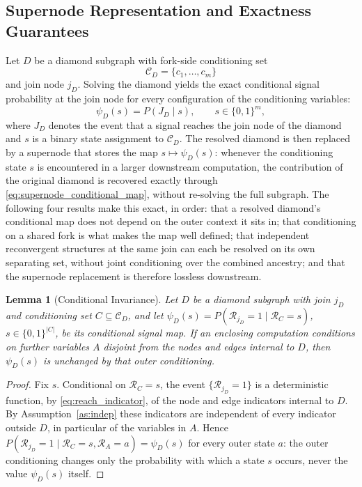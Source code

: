 \documentclass[preprint,12pt]{elsarticle}
\newtheorem{lemma}{Lemma}[section]
\begin{document}
\subsection{Supernode Representation and Exactness Guarantees}\label{sec:supernode}

Let $D$ be a diamond subgraph with fork-side conditioning set
\[
\mathcal{C}_D = \{c_1,\ldots,c_m\}
\]
and join node $j_D$. Solving the diamond yields the exact conditional signal probability at the join node for every configuration of the conditioning variables:
\begin{equation}
\psi_D(s) = P(J_D \mid s),
\qquad s \in \{0,1\}^{m},
\label{eq:supernode_conditional_map}
\end{equation}
where $J_D$ denotes the event that a signal reaches the join node of the diamond and $s$ is a binary state assignment to $\mathcal{C}_D$. The resolved diamond is then replaced by a supernode that stores the map $s \mapsto \psi_D(s)$: whenever the conditioning state $s$ is encountered in a larger downstream computation, the contribution of the original diamond is recovered exactly through \eqref{eq:supernode_conditional_map}, without re-solving the full subgraph. The following four results make this exact, in order: that a resolved diamond's conditional map does not depend on the outer context it sits in; that conditioning on a shared fork is what makes the map well defined; that independent reconvergent structures at the same join can each be resolved on its own separating set, without joint conditioning over the combined ancestry; and that the supernode replacement is therefore lossless downstream.

\begin{lemma}[Conditional Invariance]\label{lem:invariance}
Let $D$ be a diamond subgraph with join $j_D$ and conditioning set $C \subseteq \mathcal{C}_D$, and let $\psi_D(s) = P(\mathcal{R}_{j_D}=1 \mid \mathcal{R}_C = s)$, $s \in \{0,1\}^{|C|}$, be its conditional signal map. If an enclosing computation conditions on further variables $A$ disjoint from the nodes and edges internal to $D$, then $\psi_D(s)$ is unchanged by that outer conditioning.
\end{lemma}

\begin{proof}
Fix $s$. Conditional on $\mathcal{R}_C=s$, the event $\{\mathcal{R}_{j_D}=1\}$ is a deterministic function, by \eqref{eq:reach_indicator}, of the node and edge indicators internal to $D$. By Assumption~\ref{as:indep} these indicators are independent of every indicator outside $D$, in particular of the variables in $A$. Hence $P(\mathcal{R}_{j_D}=1\mid \mathcal{R}_C=s,\mathcal{R}_A=a)=\psi_D(s)$ for every outer state $a$: the outer conditioning changes only the probability with which a state $s$ occurs, never the value $\psi_D(s)$ itself.
\end{proof}
\end{document}
